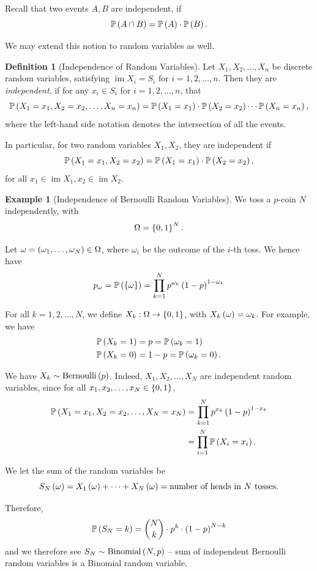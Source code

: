 \documentclass{article}
\theoremstyle{definition}
\newtheorem{definition}[theorem]{Definition}
\newtheorem{example}[theorem]{Example}
\theoremstyle{remark}
\newcommand{\Prob}{\mathbb{P}}
\newcommand{\functiondomain}[3]{#1:#2\to #3}
\newcommand{\Bernoulli}{\operatorname{Bernoulli}}
\newcommand{\Binomial}{\operatorname{Binomial}}
\newcommand{\img}{\operatorname{im}}
\begin{document}
Recall that two events \(A, B\) are independent, if
\[
    \Prob \pqty{A \cap B} = \Prob\pqty{A} \cdot \Prob\pqty{B}.
\]

We may extend this notion to random variables as well.

\begin{definition}[Independence of Random Variables]
    \label{def:independence-random-variable}%
    Let \(X_1, X_2, \ldots, X_n\) be discrete random variables, satisfying \(\img X_i = S_i\) for \(i = 1, 2, \ldots, n\). Then they are \emph{independent}, if for any \(x_i \in S_i\) for \(i = 1, 2, \ldots, n\), that
    \[
        \Prob\pqty{X_1 = x_1, X_2 = x_2, \ldots, X_n = x_n} = \Prob\pqty{X_1 = x_1} \cdot \Prob\pqty{X_2 = x_2} \cdots \Prob\pqty{X_n = x_n},
    \]
    where the left-hand side notation denotes the intersection of all the events.
\end{definition}

In particular, for two random variables \(X_1, X_2\), they are independent if
\[
    \Prob\pqty{X_1 = x_1, X_2 = x_2} = \Prob\pqty{X_1 = x_1} \cdot \Prob\pqty{X_2 = x_2},
\]
for all \(x_1 \in \img X_1, x_2 \in \img X_2\).

\begin{example}[Independence of Bernoulli Random Variables]
    \label{ex:independence-bernoulli}
    We toss a \(p\)-coin \(N\) independently, with
    \[
        \Omega = \left\{0, 1\right\}^N.
    \]

    Let \(\omega = \left(\omega_1, \ldots, \omega_N\right) \in \Omega\), where \(\omega_i\) be the outcome of the \(i\)-th toss. We hence have
    \[
        p_\omega = \Prob\pqty{\Bqty{\omega}} = \prod_{k = 1}^{N} p^{\omega_k} \pqty{1 - p}^{1 - \omega_k}
    \]

    For all \(k = 1, 2, \ldots, N\), we define \(\functiondomain{X_k}{\Omega}{\Bqty{0, 1}}\), with \(X_k\left(\omega\right) = \omega_k\). For example, we have
    \begin{align*}
        \Prob\pqty{X_k = 1} &= p = \Prob\pqty{\omega_k = 1} \\
        \Prob\pqty{X_k = 0} &= 1 - p = \Prob\pqty{\omega_k = 0}.
    \end{align*}

    We have \(X_k \sim \Bernoulli\pqty{p}\). Indeed, \(X_1, X_2, \ldots, X_N\) are independent random variables, since for all \(x_1, x_2, \ldots, x_N \in \left\{0, 1\right\}\),
    \begin{align*}
        \Prob\pqty{X_1 = x_1, X_2 = x_2, \ldots, X_N = x_N} &= \prod_{k = 1}^{N} p^{x_k} \pqty{1 - p}^{1 - x_k} \\
        &= \prod_{i = 1}^{N} \Prob\pqty{X_i = x_i}.
    \end{align*}

    We let the sum of the random variables be
    \[
        S_N\left(\omega\right) = X_1 \left(\omega\right) + \cdots + X_N \left(\omega\right) = \text{number of heads in }N\text{ tosses}.
    \]

    Therefore,
    \[
        \Prob\pqty{S_N = k} = \binom{N}{k} \cdot p^k \cdot \pqty{1 - p}^{N - k}
    \]
    and we therefore see \(S_N \sim \Binomial\pqty{N, p}\) -- sum of independent Bernoulli random variables is a Binomial random variable.
\end{example}
\end{document}
